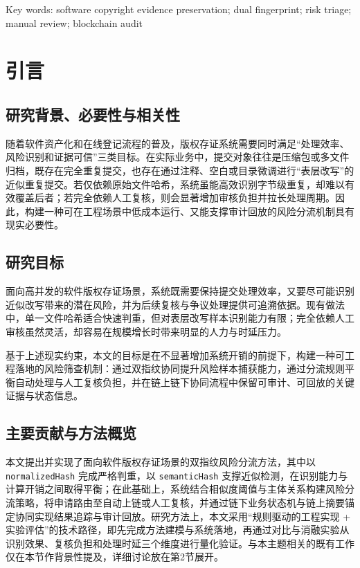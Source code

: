 \documentclass[UTF8,a4paper,zihao=5]{ctexart}
\begin{document}
\noindent Key words: software copyright evidence preservation; dual fingerprint; risk triage; manual review; blockchain audit

\section{引言}
\subsection{研究背景、必要性与相关性}
随着软件资产化和在线登记流程的普及，版权存证系统需要同时满足“处理效率、风险识别和证据可信”三类目标\cite{r1,r4,r5}。在实际业务中，提交对象往往是压缩包或多文件归档，既存在完全重复提交，也存在通过注释、空白或目录微调进行“表层改写”的近似重复提交\cite{r2,r3}。若仅依赖原始文件哈希，系统虽能高效识别字节级重复，却难以有效覆盖后者；若完全依赖人工复核，则会显著增加审核负担并拉长处理周期。因此，构建一种可在工程场景中低成本运行、又能支撑审计回放的风险分流机制具有现实必要性。

\subsection{研究目标}
面向高并发的软件版权存证场景，系统既需要保持提交处理效率，又要尽可能识别近似改写带来的潜在风险，并为后续复核与争议处理提供可追溯依据。现有做法中，单一文件哈希适合快速判重，但对表层改写样本识别能力有限；完全依赖人工审核虽然灵活，却容易在规模增长时带来明显的人力与时延压力。

基于上述现实约束，本文的目标是在不显著增加系统开销的前提下，构建一种可工程落地的风险筛查机制：通过双指纹协同提升风险样本捕获能力，通过分流规则平衡自动处理与人工复核负担，并在链上链下协同流程中保留可审计、可回放的关键证据与状态信息。

\subsection{主要贡献与方法概览}
本文提出并实现了面向软件版权存证场景的双指纹风险分流方法，其中以 \texttt{normalizedHash} 完成严格判重，以 \texttt{semanticHash} 支撑近似检测，在识别能力与计算开销之间取得平衡；在此基础上，系统结合相似度阈值与主体关系构建风险分流策略，将申请路由至自动上链或人工复核，并通过链下业务状态机与链上摘要锚定协同实现结果追踪与审计回放。研究方法上，本文采用“规则驱动的工程实现 + 实验评估”的技术路径，即先完成方法建模与系统落地，再通过对比与消融实验从识别效果、复核负担和处理时延三个维度进行量化验证。与本主题相关的既有工作仅在本节作背景性提及，详细讨论放在第2节展开。
\end{document}
